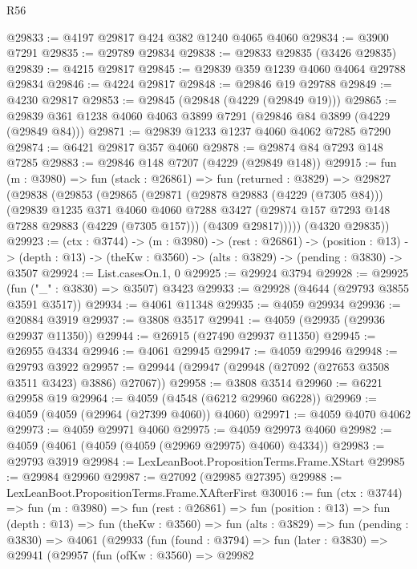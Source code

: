 \begin{lexlean}{R56}
\begin{coremodule}
@29833 := @4197 @29817 @424 @382 @1240 @4065 @4060
@29834 := @3900 @7291
@29835 := @29789 @29834
@29838 := @29833 @29835 (@3426 @29835)
@29839 := @4215 @29817
@29845 := @29839 @359 @1239 @4060 @4064 @29788 @29834
@29846 := @4224 @29817
@29848 := @29846 @19 @29788
@29849 := @4230 @29817
@29853 := @29845 (@29848 (@4229 (@29849 @19)))
@29865 := @29839 @361 @1238 @4060 @4063 @3899 @7291 (@29846 @84 @3899 (@4229 (@29849 @84)))
@29871 := @29839 @1233 @1237 @4060 @4062 @7285 @7290
@29874 := @6421 @29817 @357 @4060
@29878 := @29874 @84 @7293 @148 @7285
@29883 := @29846 @148 @7207 (@4229 (@29849 @148))
@29915 := fun (m : @3980) =>
  fun (stack : @26861) =>
  fun (returned : @3829) =>
  @29827
    (@29838
      (@29853
        (@29865
          (@29871
            (@29878 @29883 (@4229 (@7305 @84)))
            (@29839
              @1235
              @371
              @4060
              @4060
              @7288
              @3427
              (@29874 @157 @7293 @148 @7288 @29883 (@4229 (@7305 @157)))
              (@4309 @29817)))))
      (@4320 @29835))
@29923 := (ctx : @3744) ->
  (m : @3980) ->
  (rest : @26861) ->
  (position : @13) ->
  (depth : @13) -> (theKw : @3560) -> (alts : @3829) -> (pending : @3830) -> @3507
@29924 := List.casesOn.{1, 0}
@29925 := @29924 @3794
@29928 := @29925 (fun ("_" : @3830) => @3507) @3423
@29933 := @29928 (@4644 (@29793 @3855 @3591 @3517))
@29934 := @4061 @11348
@29935 := @4059 @29934
@29936 := @20884 @3919
@29937 := @3808 @3517
@29941 := @4059 (@29935 (@29936 @29937 @11350))
@29944 := @26915 (@27490 @29937 @11350)
@29945 := @26955 @4334
@29946 := @4061 @29945
@29947 := @4059 @29946
@29948 := @29793 @3922
@29957 := @29944 (@29947 (@29948 (@27092 (@27653 @3508 @3511 @3423) @3886) @27067))
@29958 := @3808 @3514
@29960 := @6221 @29958 @19
@29964 := @4059 (@4548 (@6212 @29960 @6228))
@29969 := @4059 (@4059 (@29964 (@27399 @4060)) @4060)
@29971 := @4059 @4070 @4062
@29973 := @4059 @29971 @4060
@29975 := @4059 @29973 @4060
@29982 := @4059 (@4061 (@4059 (@4059 (@29969 @29975) @4060) @4334))
@29983 := @29793 @3919
@29984 := LexLeanBoot.PropositionTerms.Frame.XStart
@29985 := @29984 @29960
@29987 := @27092 (@29985 @27395)
@29988 := LexLeanBoot.PropositionTerms.Frame.XAfterFirst
@30016 := fun (ctx : @3744) =>
  fun (m : @3980) =>
  fun (rest : @26861) =>
  fun (position : @13) =>
  fun (depth : @13) =>
  fun (theKw : @3560) =>
  fun (alts : @3829) =>
  fun (pending : @3830) =>
  @4061
    (@29933
      (fun (found : @3794) =>
      fun (later : @3830) =>
      @29941
        (@29957
          (fun (ofKw : @3560) =>
          @29982

\end{coremodule}
\end{lexlean}
